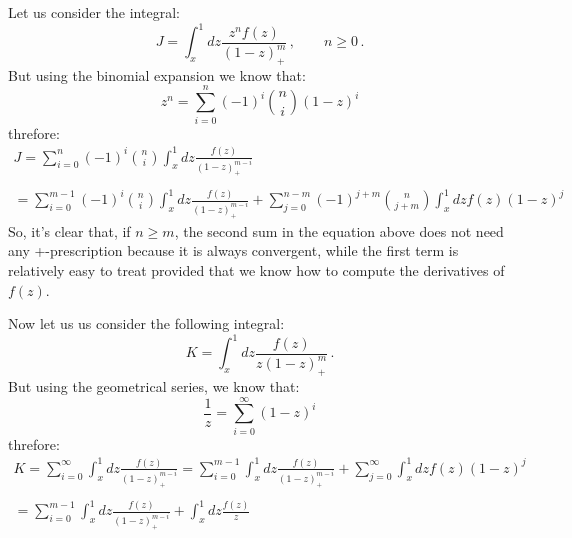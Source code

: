 \documentclass[10pt,a4paper]{article}
\begin{document}
Let us consider the integral:
\begin{equation}
J=\int_x^1 dz\frac{z^nf(z)}{(1-z)_+^m}\,,\qquad n\geq 0\,.
\end{equation}
But using the binomial expansion we know that:
\begin{equation}
z^n = \sum_{i=0}^n (-1)^i {n \choose i} (1-z)^i
\end{equation}
threfore:
\begin{equation}
\begin{array}{c}
\displaystyle J=\sum_{i=0}^n (-1)^i {n \choose i} \int_x^1
dz\frac{f(z)}{(1-z)_+^{m-i}}\\
\\
\displaystyle = \sum_{i=0}^{m-1} (-1)^i {n \choose i} \int_x^1
dz\frac{f(z)}{(1-z)_+^{m-i}} + \sum_{j=0}^{n-m}(-1)^{j+m}{n \choose j+m}\int_x^1dzf(z)(1-z)^j
\end{array}
\end{equation}
So, it's clear that, if $n\geq m$, the second sum in the equation
above does not need any +-prescription because it is always
convergent, while the first term is relatively easy to treat provided
that we know how to compute the derivatives of $f(z)$.

Now let us us consider the following integral:
\begin{equation}
K=\int_x^1 dz\frac{f(z)}{z(1-z)_+^m}\,.
\end{equation}
But using the geometrical series, we know that:
\begin{equation}
\frac1z = \sum_{i=0}^\infty (1-z)^i
\end{equation}
threfore:
\begin{equation}
\begin{array}{c}
\displaystyle K=\sum_{i=0}^\infty \int_x^1
dz\frac{f(z)}{(1-z)_+^{m-i}}= \sum_{i=0}^{m-1} \int_x^1
dz\frac{f(z)}{(1-z)_+^{m-i}} +
\sum_{j=0}^{\infty}\int_x^1dzf(z)(1-z)^j\\
\\
\displaystyle = \sum_{i=0}^{m-1} \int_x^1
dz\frac{f(z)}{(1-z)_+^{m-i}} +
\int_x^1dz\frac{f(z)}{z}
\end{array}
\end{equation}
\end{document}
